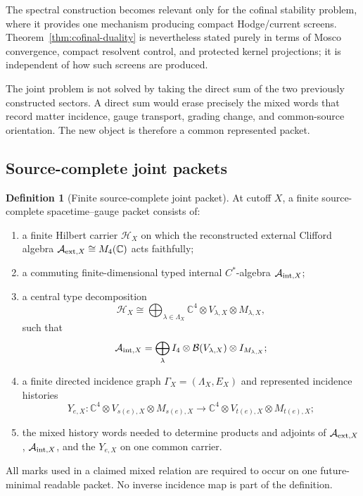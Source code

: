 \documentclass[11pt]{article}
\theoremstyle{definition}
\newtheorem{definition}[theorem]{Definition}
\theoremstyle{remark}
\newcommand{\C}{\mathbb C}
\newcommand{\A}{\mathcal A}
\newcommand{\Hh}{\mathcal H}
\begin{document}
The spectral construction becomes relevant only for the cofinal stability
problem, where it provides one mechanism producing compact Hodge/current
screens.  Theorem~\ref{thm:cofinal-duality} is nevertheless stated purely in
terms of Mosco convergence, compact resolvent control, and protected kernel
projections; it is independent of how such screens are produced.

The joint problem is not solved by taking the direct sum of the two previously
constructed sectors.  A direct sum would erase precisely the mixed words that
record matter incidence, gauge transport, grading change, and common-source
orientation.  The new object is therefore a common represented packet.

\subsection{Source-complete joint packets}

\begin{definition}[Finite source-complete joint packet]
\label{def:joint-packet}
At cutoff $X$, a finite source-complete spacetime--gauge packet consists of:
\begin{enumerate}[label=\textup{(J\arabic*)},leftmargin=3em]
\item a finite Hilbert carrier $\Hh_X$ on which the reconstructed external
      Clifford algebra $\A_{{\rm ext},X}\cong M_4(\C)$ acts faithfully;
\item a commuting finite-dimensional typed internal $C^*$-algebra
      $\A_{{\rm int},X}$;
\item a central type decomposition
      \[
      \Hh_X
      \cong
      \bigoplus_{\lambda\in\Lambda_X}
      \C^4\otimes V_{\lambda,X}\otimes M_{\lambda,X},
      \]
      such that
      \[
      \A_{{\rm int},X}
      =
      \bigoplus_{\lambda}
      I_4\otimes\mathcal B(V_{\lambda,X})\otimes I_{M_{\lambda,X}};
      \]
\item a finite directed incidence graph
      $\Gamma_X=(\Lambda_X,E_X)$ and represented incidence histories
      \[
      Y_{e,X}:
      \C^4\otimes V_{s(e),X}\otimes M_{s(e),X}
      \longrightarrow
      \C^4\otimes V_{t(e),X}\otimes M_{t(e),X};
      \]
\item the mixed history words needed to determine products and adjoints of
      $\A_{{\rm ext},X}$, $\A_{{\rm int},X}$, and the $Y_{e,X}$ on one common
      carrier.
\end{enumerate}
All marks used in a claimed mixed relation are required to occur on one
future-minimal readable packet.  No inverse incidence map is part of the
definition.
\end{definition}
\end{document}
